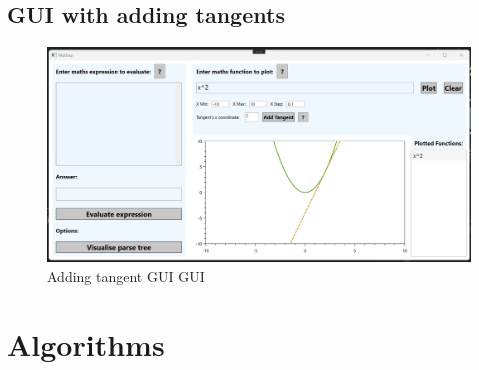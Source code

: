 \documentclass[a4paper, oneside, 11pt]{report}
\begin{document}
\section{GUI with adding tangents}
\begin{figure}[H]
\begin{center}
\includegraphics[scale=0.3 ]{AddTangentsGUI.png}
\caption{Adding tangent GUI GUI}
\label{basicgui}
\end{center}
\end{figure}


\chapter{Algorithms}
\label{app:algorithms}
\end{document}

